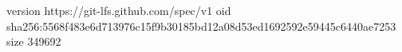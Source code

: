 version https://git-lfs.github.com/spec/v1
oid sha256:5568f483e6d713976c15f9b30185bd12a08d53ed1692592e59445c6440ae7253
size 349692
